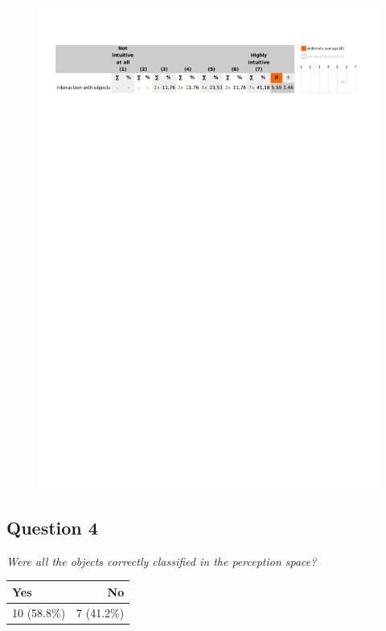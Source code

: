 \begin{figure}[H]
	\centering
	\includegraphics[width=0.6\linewidth]{gfx/Chapter_EvaluationResults/ALFTask/question3}
\end{figure}

\subsection{Question 4}
\emph{Were all the objects correctly classified in the perception space?}
\begin{table}[H]
	\begin{center}
		\small \begin{tabular*}{0.35\columnwidth}{lr}
			\\ \hline \hline
			Yes & No \\ \hline \hline

		 	10 (58.8\%) & 7 (41.2\%)\\ \hline
		\end{tabular*}
	\end{center}
\end{table}

